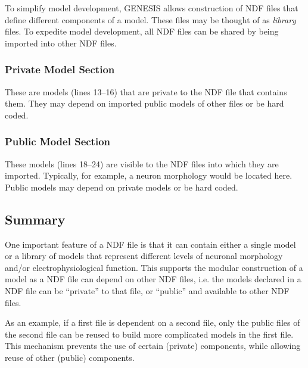 \documentclass[12pt]{article}
\begin{document}
To simplify model development, GENESIS allows construction of NDF files
that define different components of a model.  These files may be thought of as
\emph{library} files.  To expedite model development, all NDF files
can be shared by being imported into other NDF files.

\subsubsection*{Private Model Section}
These are models (lines 13--16) that are private to the NDF file that contains them.
They may depend on imported public models of other files or be hard
coded.

\subsubsection*{Public Model Section}
These models (lines 18--24) are visible to the NDF files into which they are
imported.  Typically, for example, a neuron morphology would be
located here.  Public models may depend on private models or be hard
coded.

\subsection*{Summary}
One important feature of a NDF file is that it can contain either a single model or a library of models that represent different levels of neuronal morphology and/or electrophysiological function. This supports the modular construction of a model as a NDF file can depend on other NDF files, i.e. the models declared in a NDF file can be ``private'' to that file, or ``public'' and available to other NDF files. 

As an example, if a first file is dependent on a second file, only the public files of the second file can be reused to build more complicated models in the first file. This mechanism prevents the use of certain (private) components, while allowing reuse of other (public) components.


\end{document}
